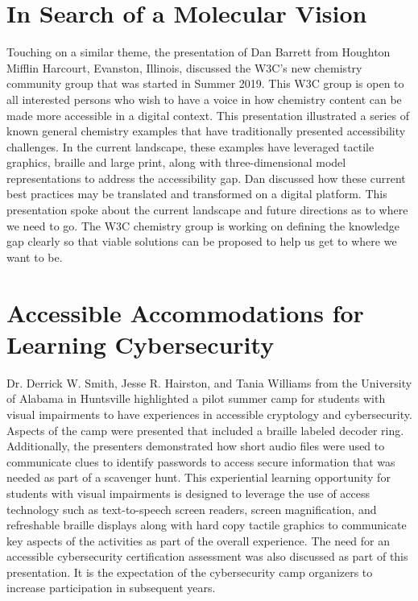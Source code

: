 \documentclass[11.5pt]{sig-alternate} %
\begin{document}
\begin{large}
\section*{In Search of a Molecular Vision}
Touching on a similar theme, the presentation of Dan Barrett from Houghton Mifflin Harcourt, Evanston, Illinois, discussed the W3C’s new chemistry community group that was started in Summer 2019. This W3C group is open to all interested persons who wish to have a voice in how chemistry content can be made more accessible in a digital context. This presentation illustrated a series of known general chemistry examples that have traditionally presented accessibility challenges. In the current landscape, these examples have leveraged tactile graphics, braille and large print, along with three-dimensional model representations to address the accessibility gap. Dan discussed how these current best practices may be translated and transformed on a digital platform. This presentation spoke about the current landscape and future directions as to where we need to go. The W3C chemistry group is working on defining the knowledge gap clearly so that viable solutions can be proposed to help us get to where we want to be. 


\section*{Accessible Accommodations for Learning Cybersecurity}
Dr. Derrick W. Smith, Jesse R. Hairston, and Tania Williams from the University of Alabama in Huntsville highlighted a pilot summer camp for students with visual impairments to have experiences in accessible cryptology and cybersecurity. Aspects of the camp were presented that included a braille labeled decoder ring. Additionally, the presenters demonstrated how short audio files were used to communicate clues to identify passwords to access secure information that was needed as part of a scavenger hunt. This experiential learning opportunity for students with visual impairments is designed to leverage the use of access technology such as text-to-speech screen readers, screen magnification, and refreshable braille displays along with hard copy tactile graphics to communicate key aspects of the activities as part of the overall experience. The need for an accessible cybersecurity certification assessment was also discussed as part of this presentation. It is the expectation of the cybersecurity camp organizers to increase participation in subsequent years.



\end{large}
\end{document}
